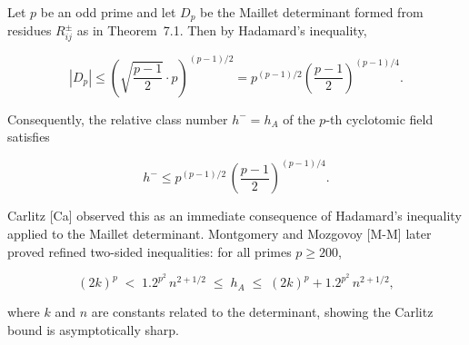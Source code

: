 Let $p$ be an odd prime and let $D_p$ be the Maillet determinant formed from residues $R_{ij}^\pm$ as in Theorem~7.1. Then by Hadamard's inequality,

$$| D_p | \leq \left( \sqrt{ \frac{p-1}{2} } \cdot p \right)^{(p-1)/2} = p^{(p-1)/2} \left( \frac{p-1}{2} \right)^{(p-1)/4}.$$

Consequently, the relative class number $h^- = h_A$ of the $p$-th cyclotomic field satisfies

$$h^- \leq p^{(p-1)/2} \, \left(\frac{p-1}{2}\right)^{(p-1)/4}.$$

Carlitz [Ca] observed this as an immediate consequence of Hadamard's inequality applied to the Maillet determinant. Montgomery and Mozgovoy [M-M] later proved refined two-sided inequalities: for all primes $p \geq 200$,

$$(2k)^p \;<\; 1.2^{p^2} \, n^{2+1/2} \;\leq\; h_A \;\leq\; (2k)^p + 1.2^{p^2} \, n^{2+1/2},$$

where $k$ and $n$ are constants related to the determinant, showing the Carlitz bound is asymptotically sharp.
